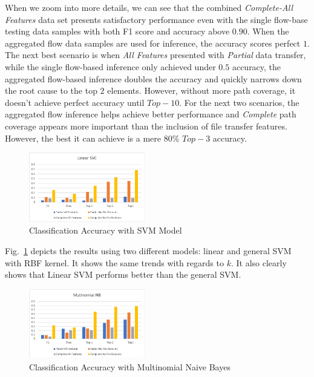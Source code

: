 When we zoom into more details, we can see that the combined {\it Complete-All Features} data set presents satisfactory performance even with the single flow-base testing data samples with 
both F1 score and accuracy above $0.90$. When the aggregated flow data samples are used for inference, the accuracy scores perfect $1$. The next best scenario is when {\it All Features} presented with 
{\it Partial} data transfer, while the single flow-based inference only achieved under $0.5$ accuracy, the aggregated flow-based inference doubles the accuracy and quickly narrows down the root cause to the 
top $2$ elements. However, without more path coverage, it doesn't achieve perfect accuracy until $Top-10$. For the next two scenarios, the aggregated flow inference helps achieve better performance 
and {\it Complete} path coverage appears more important than the inclusion of file transfer features. However, the best it can achieve is a mere $80\%$ $Top-3$ accuracy.  

\begin{figure}[!ht]
\begin{center}
\includegraphics[width=0.45\textwidth]{./figure/svc-accuracy}
\end{center}
\vspace{-0.05in}
\caption{Classification Accuracy with SVM Model}
\vspace{-0.05in}
\label{fig:svm}
\end{figure}

Fig.~\ref{fig:svm} depicts the results using two different models: linear and general SVM with RBF kernel. It shows the same trends with regards to $k$. It also clearly shows that Linear SVM performs better than the general SVM.
\begin{figure}[!ht]
\begin{center}
\includegraphics[width=0.45\textwidth]{./figure/nb-accuracy}
\end{center}
\vspace{-0.05in}
\caption{Classification Accuracy with Multinomial Naive Bayes}
\vspace{-0.05in}
\label{fig:bn}
\end{figure}

